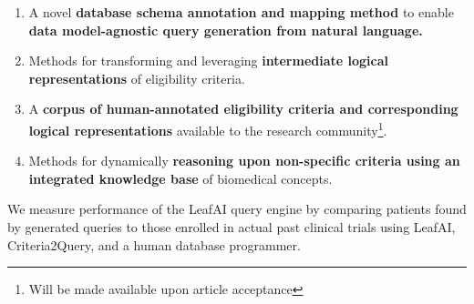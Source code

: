 \documentclass[../main.tex]{subfiles}
\begin{document}
\begin{enumerate}
    \item{A novel \textbf{database schema annotation and mapping method} to enable \textbf{data model-agnostic query generation from natural language.}}
    \item{Methods for transforming and leveraging \textbf{intermediate logical representations} of eligibility criteria.}
    \item{A \textbf{corpus of human-annotated eligibility criteria and corresponding logical representations} available to the research community\footnote{Will be made available upon article acceptance}.}
    \item{Methods for dynamically \textbf{reasoning upon non-specific criteria using an integrated knowledge base} of biomedical concepts.}
\end{enumerate}

\noindent We measure performance of the LeafAI query engine by comparing patients found by generated queries to those enrolled in actual past clinical trials using LeafAI, Criteria2Query, and a human database programmer.
\end{document}
